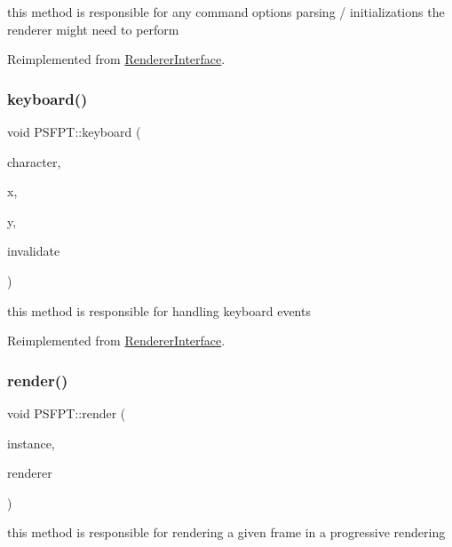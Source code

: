 this method is responsible for any command options parsing / initializations the renderer might need to perform 

Reimplemented from \hyperlink{struct_renderer_interface_a2ead9b943d6d48fcd32872e0005ebe63}{Renderer\+Interface}.

\mbox{\label{struct_p_s_f_p_t_a361baa29c599173c9517464bc534c886}} 
\subsubsection{\texorpdfstring{keyboard()}{keyboard()}}
{\footnotesize\ttfamily void P\+S\+F\+P\+T\+::keyboard (\begin{DoxyParamCaption}\item[{unsigned char}]{character,  }\item[{int}]{x,  }\item[{int}]{y,  }\item[{bool \&}]{invalidate }\end{DoxyParamCaption})\hspace{0.3cm}{\ttfamily [virtual]}}

this method is responsible for handling keyboard events 

Reimplemented from \hyperlink{struct_renderer_interface_a9f5afd3701d8d935a2ecf08fb9f5f604}{Renderer\+Interface}.

\mbox{\label{struct_p_s_f_p_t_aac923cb36f8f1d8ad27f01becef44fd9}} 
\subsubsection{\texorpdfstring{render()}{render()}}
{\footnotesize\ttfamily void P\+S\+F\+P\+T\+::render (\begin{DoxyParamCaption}\item[{const uint32}]{instance,  }\item[{\hyperlink{struct_rendering_context}{Rendering\+Context} \&}]{renderer }\end{DoxyParamCaption})\hspace{0.3cm}{\ttfamily [virtual]}}

this method is responsible for rendering a given frame in a progressive rendering


